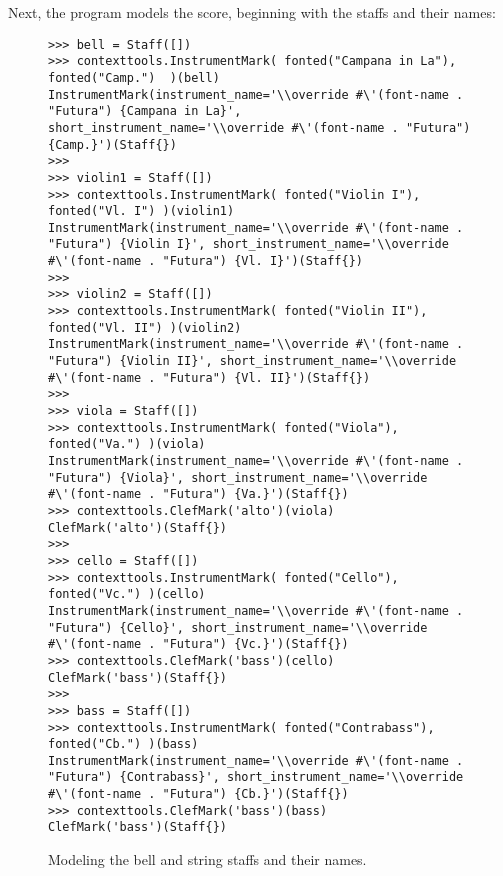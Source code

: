 Next, the program models the score, beginning with the staffs and their names:

\begin{figure}[H] 
\begin{lstlisting}[basicstyle=\scriptsize\ttfamily, breaklines=True, tabsize=4, showtabs=false, showspaces=false]
>>> bell = Staff([])
>>> contexttools.InstrumentMark( fonted("Campana in La"), fonted("Camp.")  )(bell)
InstrumentMark(instrument_name='\\override #\'(font-name . "Futura") {Campana in La}', short_instrument_name='\\override #\'(font-name . "Futura") {Camp.}')(Staff{})
>>> 
>>> violin1 = Staff([])
>>> contexttools.InstrumentMark( fonted("Violin I"), fonted("Vl. I") )(violin1)
InstrumentMark(instrument_name='\\override #\'(font-name . "Futura") {Violin I}', short_instrument_name='\\override #\'(font-name . "Futura") {Vl. I}')(Staff{})
>>> 
>>> violin2 = Staff([])
>>> contexttools.InstrumentMark( fonted("Violin II"), fonted("Vl. II") )(violin2)
InstrumentMark(instrument_name='\\override #\'(font-name . "Futura") {Violin II}', short_instrument_name='\\override #\'(font-name . "Futura") {Vl. II}')(Staff{})
>>> 
>>> viola = Staff([])
>>> contexttools.InstrumentMark( fonted("Viola"), fonted("Va.") )(viola)
InstrumentMark(instrument_name='\\override #\'(font-name . "Futura") {Viola}', short_instrument_name='\\override #\'(font-name . "Futura") {Va.}')(Staff{})
>>> contexttools.ClefMark('alto')(viola)
ClefMark('alto')(Staff{})
>>> 
>>> cello = Staff([])
>>> contexttools.InstrumentMark( fonted("Cello"), fonted("Vc.") )(cello)
InstrumentMark(instrument_name='\\override #\'(font-name . "Futura") {Cello}', short_instrument_name='\\override #\'(font-name . "Futura") {Vc.}')(Staff{})
>>> contexttools.ClefMark('bass')(cello)
ClefMark('bass')(Staff{})
>>> 
>>> bass = Staff([])
>>> contexttools.InstrumentMark( fonted("Contrabass"), fonted("Cb.") )(bass)
InstrumentMark(instrument_name='\\override #\'(font-name . "Futura") {Contrabass}', short_instrument_name='\\override #\'(font-name . "Futura") {Cb.}')(Staff{})
>>> contexttools.ClefMark('bass')(bass)
ClefMark('bass')(Staff{})\end{lstlisting}

\caption{Modeling the bell and string staffs and their names. } 
\end{figure}

